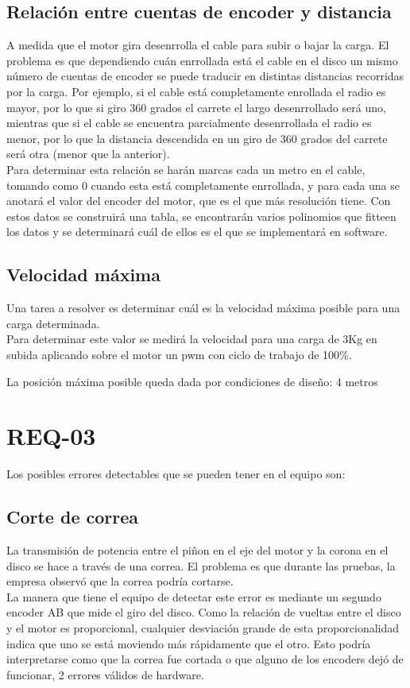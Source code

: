 \subsection{Relación entre cuentas de encoder y distancia}
A medida que el motor gira desenrrolla el cable para subir o bajar la carga. El problema es que dependiendo cuán enrrollada está el cable en el disco un mismo número de cuentas de encoder se puede traducir en distintas distancias recorridas por la carga. Por ejemplo, si el cable está completamente enrollada el radio es mayor, por lo que si giro 360 grados el carrete el largo desenrrollado será uno, mientras que si el cable se encuentra parcialmente desenrrollada el radio es menor, por lo que la distancia descendida en un giro de 360 grados del carrete será otra (menor que la anterior).\\

Para determinar esta relación se harán marcas cada un metro en el cable, tomando como 0 cuando esta está completamente enrrollada, y para cada una se anotará el valor del encoder del motor, que es el que más resolución tiene. Con estos datos se construirá una tabla, se encontrarán varios polinomios que fitteen los datos y se determinará cuál de ellos es el que se implementará en software.

\subsection{Velocidad máxima}
Una tarea a resolver es determinar cuál es la velocidad máxima posible para una carga determinada.\\

Para determinar este valor se medirá la velocidad para una carga de 3Kg en subida aplicando sobre el motor un pwm con ciclo de trabajo de 100\%.

La posición máxima posible queda dada por condiciones de diseño: 4 metros

\section{REQ-03} \label{sec:\thesection}
Los posibles errores detectables que se pueden tener en el equipo son:

\subsection{Corte de correa}
La transmisión de potencia entre el piñon en el eje del motor y la corona en el disco se hace a través de una correa. El problema es que durante las pruebas, la empresa observó que la correa podría cortarse. \\
La manera que tiene el equipo de detectar este error es mediante un segundo encoder AB que mide el giro del disco. Como la relación de vueltas entre el disco y el motor es proporcional, cualquier desviación grande de esta proporcionalidad indica que uno se está moviendo más rápidamente que el otro. Esto podría interpretarse como que la correa fue cortada o que alguno de los encoders dejó de funcionar, 2 errores válidos de hardware.

